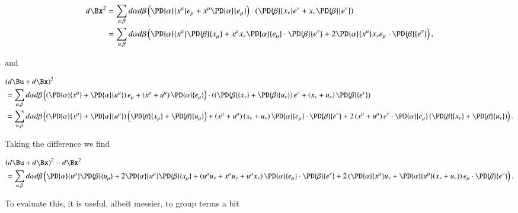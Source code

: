 \begin{align*}
d\Bx^2 
&= 
\sum_{\alpha, \beta} 
d\alpha 
d\beta 
\left( 
\PD{\alpha}{x^\mu} e_\mu
+
x^\mu
\PD{\alpha}{e_\mu} 
\right)
\cdot
\left( 
\PD{\beta}{x_\nu} e^\nu
+
x_\nu
\PD{\beta}{e^\nu} 
\right) 
\\
&=
\sum_{\alpha, \beta} 
d\alpha 
d\beta 
\left( 
\PD{\alpha}{x^\mu} \PD{\beta}{x_\mu} 
+
x^\mu x_\nu
\PD{\alpha}{e_\mu} 
\cdot
\PD{\beta}{e^\nu} 
+ 
2 \PD{\alpha}{x^\mu} 
x_\nu
e_\mu \cdot
\PD{\beta}{e^\nu} 
\right),
\end{align*}

and

\begin{align*}
&(d\Bu + d\Bx)^2 \\
&= 
\sum_{\alpha, \beta}
d\alpha 
d\beta 
\left( 
\left(
\PD{\alpha}{x^\mu} 
+
\PD{\alpha}{u^\mu} 
\right)
e_\mu
+
\left(
x^\mu
+
u^\mu
\right)
\PD{\alpha}{e_\mu} 
\right)
\cdot
\left( 
\left(
\PD{\beta}{x_\nu} 
+
\PD{\beta}{u_\nu} 
\right)
e^\nu
+
\left(
x_\nu
+
u_\nu
\right)
\PD{\beta}{e^\nu} 
\right) \\
&= 
\sum_{\alpha, \beta}
d\alpha 
d\beta 
\left(
\left(
\PD{\alpha}{x^\mu} 
+
\PD{\alpha}{u^\mu} 
\right)
\left(
\PD{\beta}{x_\mu} 
+
\PD{\beta}{u_\mu} 
\right)
+
\left(
x^\mu
+
u^\mu
\right)
\left(
x_\nu
+
u_\nu
\right)
\PD{\alpha}{e_\mu} 
\cdot
\PD{\beta}{e^\nu} 
+
2
\left(
x^\mu
+
u^\mu
\right)
e^\nu
\cdot
\PD{\alpha}{e_\mu} 
\left(
\PD{\beta}{x_\nu} 
+
\PD{\beta}{u_\nu} 
\right)
\right).
\end{align*}

Taking the difference we find

\begin{equation}\label{eqn:continuumL2:610}
\begin{aligned}
&(d\Bu + d\Bx)^2 - d\Bx^2 \\
&=
\sum_{\alpha, \beta}
d\alpha 
d\beta 
\left( 
\PD{\alpha}{u^\mu} 
\PD{\beta}{u_\mu} 
+
2
\PD{\alpha}{u^\mu} 
\PD{\beta}{x_\mu} 
+ 
\left(
u^\mu u_\nu 
+
x^\mu u_\nu 
+
u^\mu x_\nu 
\right)
\PD{\alpha}{e_\mu}
\cdot
\PD{\beta}{e^\nu} 
+
2 
\left(
\PD{\alpha}{x^\mu}
u_\nu
+
\PD{\alpha}{u^\mu}(
x_\nu
+
u_\nu
)
\right)
e_\mu \cdot 
\PD{\beta}{e^\nu}
\right).
\end{aligned}
\end{equation}

To evaluate this, it is useful, albeit messier, to group terms a bit

